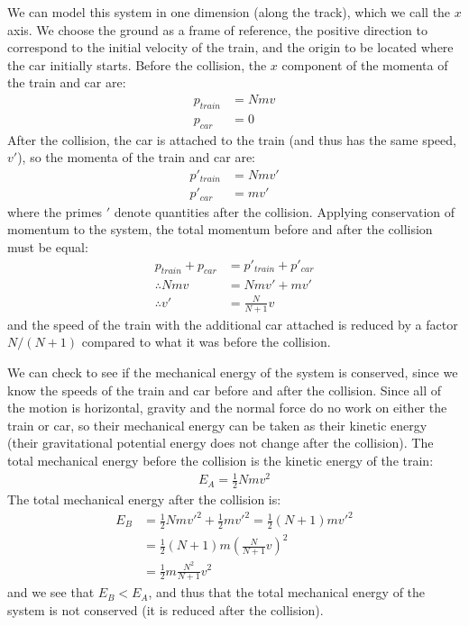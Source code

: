 \begin{example}
We can model this system in one dimension (along the track), which we call the $x$ axis. We choose the ground as a frame of reference, the positive direction to correspond to the initial velocity of the train, and the origin to be located where the car initially starts. Before the collision, the $x$ component of the momenta of the train and car are:
\begin{align*}
p_{train}&=Nmv\\
p_{car}&=0
\end{align*}
After the collision, the car is attached to the train (and thus has the same speed, $v'$), so the momenta of the train and car are:
\begin{align*}
p'_{train}&=Nmv'\\
p'_{car}&=mv'
\end{align*}
where the primes $'$ denote quantities after the collision. Applying conservation of momentum to the system, the total momentum before and after the collision must be equal:
\begin{align*}
p_{train}+p_{car}&=p'_{train}+p'_{car}\\
\therefore Nmv &= Nmv' +mv'\\
\therefore v' &=\frac{N}{N+1}v
\end{align*}
and the speed of the train with the additional car attached is reduced by a factor $N/(N+1)$ compared to what it was before the collision.

We can check to see if the mechanical energy of the system is conserved, since we know the speeds of the train and car before and after the collision. Since all of the motion is horizontal, gravity and the normal force do no work on either the train or car, so their mechanical energy can be taken as their kinetic energy (their gravitational potential energy does not change after the collision). The total mechanical energy before the collision is the kinetic energy of the train:
\begin{align*}
E_A = \frac{1}{2}Nmv^2
\end{align*}
The total mechanical energy after the collision is:
\begin{align*}
E_B &= \frac{1}{2}Nmv'^2 + \frac{1}{2}mv'^2 = \frac{1}{2}(N+1)mv'^2 \\
&=\frac{1}{2}(N+1)m \left( \frac{N}{N+1}v \right)^2\\
&=\frac{1}{2}m\frac{N^2}{N+1}v^2
\end{align*}
and we see that $E_B<E_A$, and thus that the total mechanical energy of the system is not conserved (it is reduced after the collision).


\end{example}
